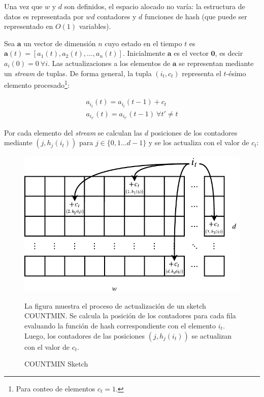 \documentclass[a4paper,10pt, oneside]{article}
\begin{document}
Una vez que $w$ y $d$ son definidos, el espacio alocado no varía: la estructura de datos es representada por $wd$ contadores y $d$ funciones de hash (que puede ser representado en $O(1)$ variables\cite{Motwani:1995:RA:211390}).


Sea $\mathbf{a}$ un vector de dimensión $n$ cuyo estado en el tiempo $t$ es $\mathbf{a}(t)=[a_1(t), a_2(t), \dots, a_n(t)]$. Inicialmente $\mathbf{a}$ es el vector $\mathbf{0}$, es decir $a_i(0)=0 \ \forall i$. Las actualizaciones a los elementos de $\mathbf{a}$ se representan mediante un \textit{stream} de tuplas. De forma general, la tupla $(i_t, c_t)$ representa el $t$-ésimo elemento procesado\footnote{Para conteo de elementos $c_t=1$.}:

\begin{gather*}
a_{i_t}(t)=a_{i_t}(t-1) + c_t\\
a_{i_{t'}}(t)=a_{i_{t'}}(t-1) \ \forall t' \neq t 
\end{gather*}

Por cada elemento del \textit{stream} se calculan las $d$ posiciones de los contadores mediante $(j, h_j(i_t))$ para $j \in \{0,1 \dots d-1 \}$ y se los actualiza con el valor de $c_t$:

\begin{figure}[ht]
	\centering
	\includegraphics[width=1\textwidth]{./graph/cm_sketch.pdf}
	\caption{COUNTMIN Sketch}
	\label{fig:cm_sketch}
	\medskip
	\small
	
	\parbox{13.1cm}{La figura muestra el proceso de actualización de un sketch COUNTMIN. Se calcula la posición de los contadores para cada fila evaluando la función de hash correspondiente con el elemento $i_t$. Luego, los contadores de las posiciones $(j, h_j(i_t))$ se actualizan con el valor de $c_t$.}
	
\end{figure}
\end{document}
